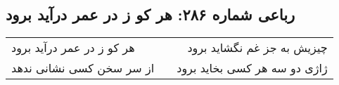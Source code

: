\begin{center}
\section*{رباعی شماره ۲۸۶: هر کو ز در عمر درآید برود}
\label{sec:sh286}
\begin{longtable}{l p{0.5cm} r}
هر کو ز در عمر درآید برود
&&
چیزیش به جز غم نگشاید برود
\\
از سر سخن کسی نشانی ندهد
&&
ژاژی دو سه هر کسی بخاید برود
\\
\end{longtable}
\end{center}
